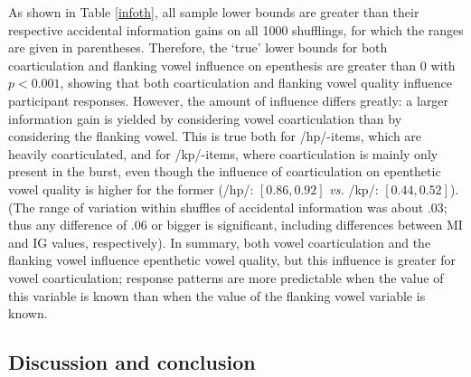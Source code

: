 As shown in Table \ref{infoth}, all sample lower bounds are greater than their respective accidental information gains on all 1000 shufflings, for which the ranges are given in parentheses. Therefore, the `true' lower bounds for both coarticulation and flanking vowel influence on epenthesis are greater than $0$ with $p<0.001$, showing that both coarticulation and flanking vowel quality influence participant responses. However, the amount of influence differs greatly: a larger information gain is yielded by considering vowel coarticulation  %
than by considering the flanking vowel. This is true both for /hp/-items, which are heavily coarticulated, and for /kp/-items, where coarticulation is mainly only present in the burst, even though the influence of coarticulation on epenthetic vowel quality is higher for the former (/hp/: $[0.86, 0.92]$ \textit{vs.} /kp/: $[0.44, 0.52]$). (The range of variation within shuffles of accidental information was about .03; thus any difference of .06 or bigger is significant, including differences between MI and IG values, respectively). In summary, both vowel coarticulation and the flanking vowel influence epenthetic vowel quality, but this influence is greater for vowel coarticulation; response patterns are more predictable when the value of this variable is known than when the value of the flanking vowel variable is known.

\subsection{Discussion and conclusion}

